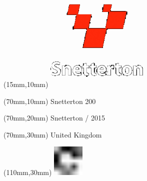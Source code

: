 \null\newpage
\begin{textblock*}{50mm}(15mm,10mm)%
\includegraphics[width=50mm]{LG/SNE.png}
\end{textblock*}
\begin{textblock*}{130mm}(70mm,10mm)%
{\fontsize{20}{20}\selectfont Snetterton 200}\\
\end{textblock*}
\begin{textblock*}{120mm}(70mm,20mm)%
{\fontsize{16}{16}\selectfont Snetterton / 2015}\\
\end{textblock*}
\begin{textblock*}{120mm}(70mm,30mm)%
{\fontsize{12}{12}\selectfont United Kingdom}
\end{textblock*}
\begin{textblock*}{30mm}(110mm,30mm)%
\centering
\includegraphics[height=15mm]{icons/fa-rotate-right.pdf}
\end{textblock*}
